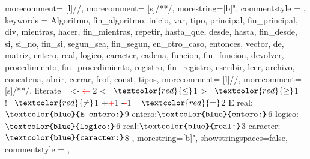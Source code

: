
                  {
                    morecomment= [l]{//},
                   morecomment= [s]{/*}{*/},
                   morestring=[b]",
                    commentstyle = \color{ccomentarios},
                    keywords =
                    { Algoritmo,
                      fin_algoritmo,
                      inicio,
                      var,
                      tipo,
                      principal,
                      fin_principal,
                      div,
                      mientras,
                      hacer,
                      fin_mientras,
                      repetir,
                      hasta_que,
                      desde,
                      hasta,
                      fin_desde,
                      si,
                      si_no,
                      fin_si,
                      segun_sea,
                      fin_segun,
                      en_otro_caso,
                      entonces,
                      vector,
                      de,
                      matriz,
                      entero,
                      real,
                      logico,
                      caracter,
                      cadena,
                      funcion,
                      fin_funcion,
                      devolver,
                      procedimiento,
                      fin_procedimiento,
                      registro,
                      fin_registro,
                      escribir,
                      leer,
                      archivo,
                      concatena,
                      abrir,
                      cerrar,
                      feof,
                      const,
                      tipos},
                      morecomment= [l]{//},
                      morecomment= [s]{/*}{*/},
                      literate={
                      {<-}{{\textcolor{red}{{$\leftarrow$}}}}2
                      {<=}{{$\textcolor{red}{\leq}$}}1
                      {>=}{{$\textcolor{red}{\geq}$}}1
                      {!=}{{$\textcolor{red}{\neq}$}}1
                      {+}{{\textcolor{red}{+}}}1
                      {-}{{\textcolor{red}{-}}}1
                      {=}{{$\textcolor{red}{=}$}}2
                      {E real:}{{$\texttt{\textcolor{blue}{E entero:}}$}}9
                      {entero:}{{$\texttt{\textcolor{blue}{entero:}}$}}6
                      {logico:}{{$\texttt{\textcolor{blue}{logico:}}$}}6
                      {real:}{{$\texttt{\textcolor{blue}{real:}}$}}3
                      {caracter:}{{$\texttt{\textcolor{blue}{caracter:}}$}}8
                      }
                      ,
                   morestring=[b]",
                   showstringspaces=false,
                    commentstyle = \color{ccomentarios},
                  }
